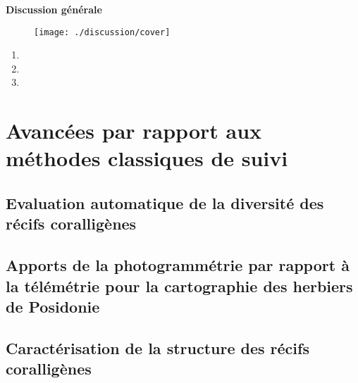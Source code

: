 \setcounter{section}{0} %
\renewcommand*{\theHsection}{\theHchapter.\the\value{section}} %

\centerline{\bfseries\textcolor{bleusection}{ \Huge Discussion générale}}  

\bigskip

\begin{figure}[H] 
	\begin{center}
	\texttt{[image: ./discussion/cover]}
    \end{center}
\end{figure}

{\LARGE
\begin{enumerate}[label=\textcolor{bleusection}{\arabic*}{.}, leftmargin=2cm]
  \item {}
  \item {}
  \item {}
\end{enumerate}
}

\clearpage
\pagestyle{discussion}

\section{Avancées par rapport aux méthodes classiques de suivi}\label{discussion.1}
\subsection{Evaluation automatique de la diversité des récifs coralligènes}
\newpage
\subsection{Apports de la photogrammétrie par rapport à la télémétrie pour la cartographie des herbiers de Posidonie}
\newpage
\subsection{Caractérisation de la structure des récifs coralligènes}
\newpage
